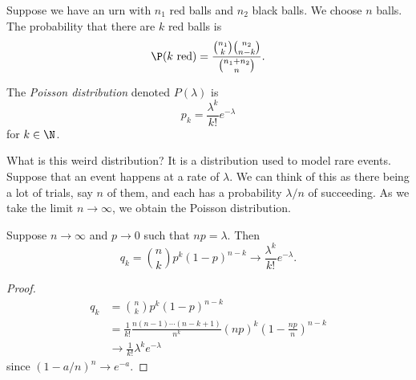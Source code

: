 \documentclass[a4paper]{article}
\begin{document}
\begin{defi}
  Suppose we have an urn with $n_1$ red balls and $n_2$ black balls. We choose $n$ balls. The probability that there are $k$ red balls is
  \[
    \P(k\text{ red}) = \frac{\binom{n_1}{k}\binom{n_2}{n - k}}{\binom{n_1 + n_2}{n}}.
  \]
\end{defi}

\begin{defi}
  The \emph{Poisson distribution} denoted $P(\lambda)$ is
  \[
    p_k = \frac{\lambda^k}{k!}e^{-\lambda}
  \]
  for $k\in \N$.
\end{defi}
What is this weird distribution? It is a distribution used to model rare events. Suppose that an event happens at a rate of $\lambda$. We can think of this as there being a lot of trials, say $n$ of them, and each has a probability $\lambda/n$ of succeeding. As we take the limit $n\to \infty$, we obtain the Poisson distribution.

\begin{thm}
  Suppose $n\to \infty$ and $p\to 0$ such that $np = \lambda$. Then
  \[
    q_k = \binom{n}{k}p^k(1 -p)^{n - k} \to \frac{\lambda^k}{k!}e^{-\lambda}.
  \]
\end{thm}

\begin{proof}
\begin{align*}
  q_k &= \binom{n}{k}p^k(1 - p)^{n - k}\\
  &= \frac{1}{k!} \frac{n(n - 1)\cdots(n - k + 1)}{n^k}(np)^k \left(1 - \frac{np}{n}\right)^{n - k}\\
  &\to \frac{1}{k!}\lambda^ke^{-\lambda}
\end{align*}
since $(1 - a/n)^n \to e^{-a}$.
\end{proof}
\end{document}

